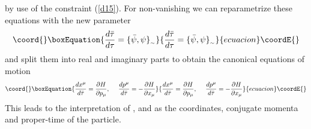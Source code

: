 \documentclass[a4paper,a4paper]{article}
\begin{document}
by use of the constraint (\ref{d15}). For non-vanishing \myHighlight{$\{\bar{\psi },\psi
\}_{_{\sim }}$}\coordHE{} we can reparametrize these equations with the new parameter
\myHighlight{$\bar{\tau }$}\coordHE{}
\begin{equation}\coord{}\boxEquation{ 
\frac{d\bar{\tau }}{d\tau } = \{\bar{\psi },\psi  \}_{_{\sim }} 
\label{d10}
}{ 
\frac{d\bar{\tau }}{d\tau } = \{\bar{\psi },\psi  \}_{_{\sim }} 
}{ecuacion}\coordE{}\end{equation}
and split them into real and imaginary parts to obtain the canonical equations
of motion
\begin{equation}\coord{}\boxEquation{ 
\frac{dx^{\mu }}{d\bar{\tau}}=\frac{\partial H}{\partial p_{\mu   }} , \ \ \ \
\frac{dp^{\mu }}{d\bar{\tau}}= -\frac{\partial H}{\partial x_{\mu  }}
\label{d11}
}{ 
\frac{dx^{\mu }}{d\bar{\tau}}=\frac{\partial H}{\partial p_{\mu   }} , \ \ \ \
\frac{dp^{\mu }}{d\bar{\tau}}= -\frac{\partial H}{\partial x_{\mu  }}
}{ecuacion}\coordE{}\end{equation}
This leads to the interpretation of \myHighlight{$x$}\coordHE{}, \coordHE{} and \myHighlight{$\bar{\tau }$}\coordHE{} as the
coordinates, conjugate momenta and proper-time of the particle. 
\end{document}
